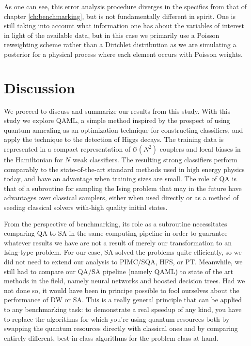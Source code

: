 As one can see, this error analysis procedure diverges in the specifics from that of chapter \ref{ch:benchmarking}, but is not fundamentally different in spirit. One is still taking into account what information one has about the variables of interest in light of the available data, but in this case we primarily use a Poisson reweighting scheme rather than a Dirichlet distribution as we are simulating a posterior for a physical process where each element occurs with Poisson weights.

\section{Discussion}
We proceed to discuss and summarize our results from this study.
With this study we explore QAML, a simple method inspired by the prospect of using quantum annealing as an optimization technique for constructing classifiers, and apply the technique to the detection of Higgs decays. The training data is represented in a compact representation of $\mathcal{O}(N^2)$ couplers and local biases in the Hamiltonian for $N$ weak classifiers.
The resulting strong classifiers perform comparably to the state-of-the-art standard methods used in high energy physics today, and have an advantage when training sizes are small.  The role of QA is that of a subroutine for sampling the Ising problem that may in the future have advantages over classical samplers, either when used directly or as a method of seeding classical solvers with-high quality initial states.

From the perspective of benchmarking, its role as a subroutine necessitates comparing QA to SA in the same computing pipeline in order to guarantee whatever results we have are not a result of merely our transformation to an Ising-type problem. For our case, SA solved the problems quite efficiently, so we did not need to extend our analysis to PIMC/SQA, HFS, or PT. Meanwhile, we still had to compare our QA/SA pipeline (namely QAML) to state of the art methods in the field, namely neural networks and boosted decision trees. Had we not done so, it would have been in principe possible to fool ourselves about the performance of DW or SA. This is a really general principle that can be applied to any benchmarking task: to demonstrate a real speedup of any kind, you have to replace the algorithms for which you're using quantum resources both by swapping the quantum resources directly with classical ones and by comparing entirely different, best-in-class algorithms for the problem class at hand.

